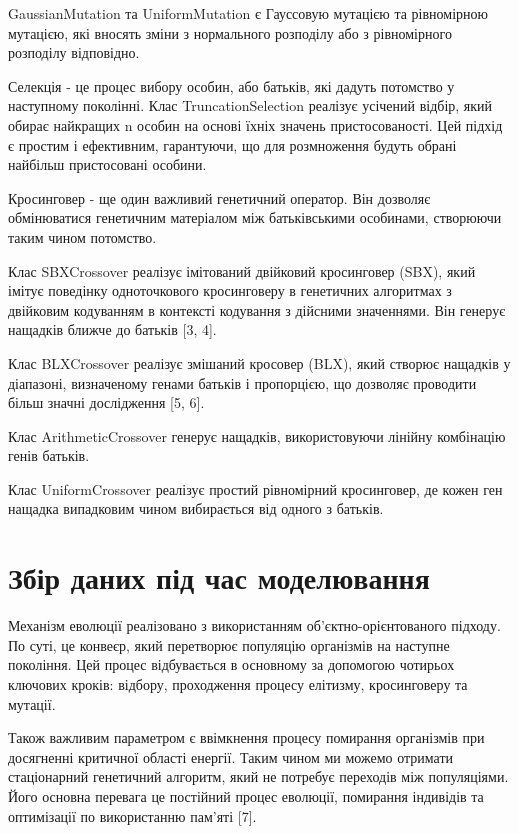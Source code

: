 GaussianMutation та UniformMutation є Гауссовую мутацією та рівномірною мутацією, які вносять зміни з нормального розподілу або з рівномірного розподілу відповідно.

Селекція - це процес вибору особин, або батьків, які дадуть потомство у наступному поколінні. Клас TruncationSelection реалізує усічений відбір, який обирає найкращих n особин на основі їхніх значень пристосованості. Цей підхід є простим і ефективним, гарантуючи, що для розмноження будуть обрані найбільш пристосовані особини.

Кросинговер - ще один важливий генетичний оператор. Він дозволяє обмінюватися генетичним матеріалом між батьківськими особинами, створюючи таким чином потомство.

Клас SBXCrossover реалізує імітований двійковий кросинговер (SBX), який імітує поведінку одноточкового кросинговеру в генетичних алгоритмах з двійковим кодуванням в контексті кодування з дійсними значеннями. Він генерує нащадків ближче до батьків [3, 4].

Клас BLXCrossover реалізує змішаний кросовер (BLX), який створює нащадків у діапазоні, визначеному генами батьків і пропорцією, що дозволяє проводити більш значні дослідження [5, 6].

Клас ArithmeticCrossover генерує нащадків, використовуючи лінійну комбінацію генів батьків.

Клас UniformCrossover реалізує простий рівномірний кросинговер, де кожен ген нащадка випадковим чином вибирається від одного з батьків.


\section{Збір даних під час моделювання}

Механізм еволюції реалізовано з використанням об'єктно-орієнтованого підходу. По суті, це конвеєр, який перетворює популяцію організмів на наступне покоління. Цей процес відбувається в основному за допомогою чотирьох ключових кроків: відбору, проходження процесу елітизму, кросинговеру та мутації.

Також важливим параметром є ввімкнення процесу помирання організмів при досягненні критичної області енергії. Таким чином ми можемо отримати стаціонарний генетичний алгоритм, який не потребує переходів між популяціями. Його основна перевага це постійний процес еволюції, помирання індивідів та оптимізації по використанню пам’яті [7].


